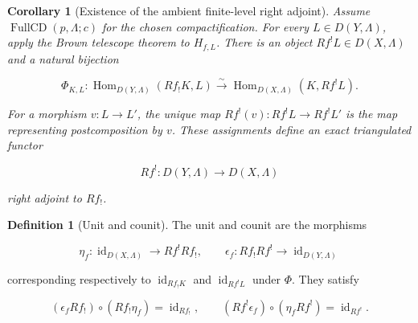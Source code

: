 \documentclass[10pt]{article}
\newtheorem{corollary}[theorem]{Corollary}
\theoremstyle{definition}
\newtheorem{definition}[theorem]{Definition}
\newcommand{\HomD}{\operatorname{Hom}}
\begin{document}
\begin{corollary}[Existence of the ambient finite-level right adjoint]
Assume \(\operatorname{FullCD}(p,\Lambda;c)\) for the chosen
compactification.  For every \(L\in D(Y,\Lambda)\), apply the Brown telescope
theorem to \(H_{f,L}\).
There is an object \(Rf^!L\in D(X,\Lambda)\) and a natural bijection

\[
 \Phi_{K,L}:
 \HomD_{D(Y,\Lambda)}(Rf_!K,L)
 \xrightarrow{\sim}
 \HomD_{D(X,\Lambda)}(K,Rf^!L).
\]

For a morphism \(v:L\to L'\), the unique map \(Rf^!(v):Rf^!L\to Rf^!L'\)
is the map representing postcomposition by \(v\).  These assignments define
an exact triangulated functor

\[
 Rf^!:D(Y,\Lambda)\longrightarrow D(X,\Lambda)
\]

right adjoint to \(Rf_!\).
\end{corollary}

\begin{definition}[Unit and counit]
The unit and counit are the morphisms

\[
 \eta_f:\operatorname{id}_{D(X,\Lambda)}\longrightarrow Rf^!Rf_!,
 \qquad
 \epsilon_f:Rf_!Rf^!\longrightarrow\operatorname{id}_{D(Y,\Lambda)}
\]

corresponding respectively to \(\operatorname{id}_{Rf_!K}\) and
\(\operatorname{id}_{Rf^!L}\) under \(\Phi\).  They satisfy

\[
 (\epsilon_fRf_!)\circ(Rf_!\eta_f)=\operatorname{id}_{Rf_!},
 \qquad
 (Rf^!\epsilon_f)\circ(\eta_fRf^!)=\operatorname{id}_{Rf^!}.
\]
\end{definition}
\end{document}
